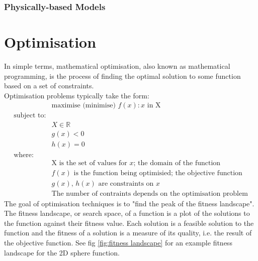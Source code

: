 \subsubsection{Physically-based Models}



\section{Optimisation}
In simple terms, mathematical optimisation, also known as mathematical programming, is the process of finding the optimal solution to some function based on a set of constraints.
\\Optimisation problems typically take the form\cite{mathprog}:
\begin{equation}
  \begin{split}
    &\text{maximise (minimise) } f(x) : x \text{ in X}
    \\\text{subject to:}
    \\&X \in \mathbb{R}
    \\&g(x) < 0
    \\&h(x) = 0
    \\\text{where:}
    \\&\text{X is the set of values for } x \text{; the domain of the function}
    \\&f(x) \text{ is the function being optimisied; the objective function}
    \\&g(x) \text{, } h(x) \text{ are constraints on } x 
    \\&\text{The number of contraints depends on the optimisation problem}
  \end{split}
\label{eq:optimisation}
\end{equation}
The goal of optimisation techniques is to "find the peak of the fitness landscape"\cite{stoch}. The fitness landscape, or search space, of a function is a plot of the solutions to the function against their fitness value. Each solution is a feasible solution to the function and the fitness of a solution is a measure of its quality, i.e. the result of the objective function. See fig \ref{fig:fitness landscape}\cite{fitland} for an example fitness landscape for the 2D sphere function.
